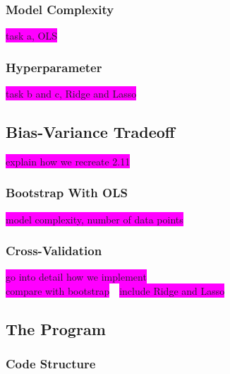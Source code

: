 \documentclass[aps,pra,english,notitlepage,reprint,nofootinbib]{revtex4-1}  %
\begin{document}
\subsubsection{Model Complexity}
\colorbox{magenta}{task a, OLS}

\subsubsection{Hyperparameter}
\colorbox{magenta}{task b and c, Ridge and Lasso}

\subsection{Bias-Variance Tradeoff}
\colorbox{magenta}{explain how we recreate 2.11}

\subsubsection{Bootstrap With OLS}
\colorbox{magenta}{model complexity, number of data points}

\subsubsection{Cross-Validation}
\colorbox{magenta}{go into detail how we implement} \\
\colorbox{magenta}{compare with bootstrap}\ \
\colorbox{magenta}{include Ridge and Lasso}


\subsection{The Program}\label{subsec:program}
\subsubsection{Code Structure}\label{subsubsec:codestructure}
\end{document}
